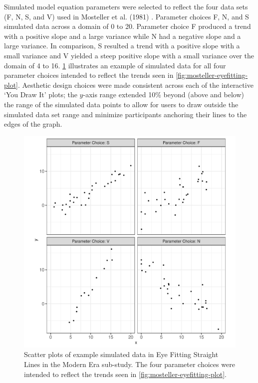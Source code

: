 \documentclass[print]{nuthesis}
\begin{document}
Simulated model equation parameters were selected to reflect the four data sets (F, N, S, and V) used in Mosteller et al. (1981) .
Parameter choices F, N, and S simulated data across a domain of 0 to 20.
Parameter choice F produced a trend with a positive slope and a large variance while N had a negative slope and a large variance.
In comparison, S resulted a trend with a positive slope with a small variance and V yielded a steep positive slope with a small variance over the domain of 4 to 16.
\cref{fig:eyefitting-simplot} illustrates an example of simulated data for all four parameter choices intended to reflect the trends seen in \cref{fig:mosteller-eyefitting-plot}.
Aesthetic design choices were made consistent across each of the interactive `You Draw It' plots; the \(y\)-axis range extended 10\% beyond (above and below) the range of the simulated data points to allow for users to draw outside the simulated data set range and minimize participants anchoring their lines to the edges of the graph.

\begin{figure}[tbp]

{\centering \includegraphics[width=1\linewidth,]{thesis_files/figure-latex/eyefitting-simplot-1} 

}

\caption[Eye Fitting Straight Lines in the Modern Era Simulated Data Example]{Scatter plots of example simulated data in Eye Fitting Straight Lines in the Modern Era sub-study. The four parameter choices were intended to reflect the trends seen in \cref{fig:mosteller-eyefitting-plot}.}\label{fig:eyefitting-simplot}
\end{figure}
\end{document}
